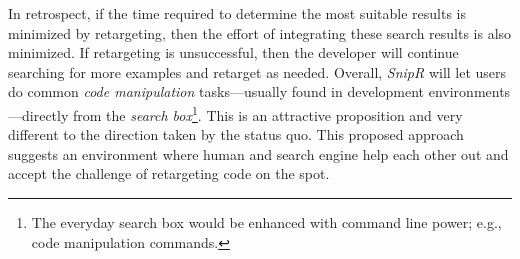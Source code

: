 In retrospect, if the time required to determine the most suitable results is minimized by retargeting, then the effort of integrating these search results is also minimized. If retargeting is unsuccessful, then the developer will continue searching for more examples and retarget as needed. Overall, \emph{SnipR} will let users do common \emph{code manipulation} tasks---usually found in development environments---directly from the \emph{search box}\footnote{The everyday search box would be enhanced with command line power; e.g., code manipulation commands.}. This is an attractive proposition and very different to the direction taken by the status quo. This proposed approach suggests an environment where human and search engine help each other out and accept the challenge of retargeting code on the spot. 


